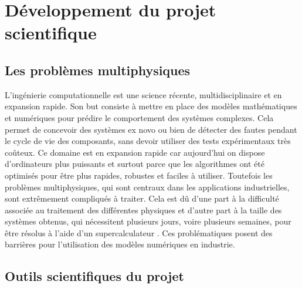 \documentclass[12pt, french]{article}
\begin{document}
	
	\section{Développement du projet scientifique}
	
	\subsection{Les problèmes multiphysiques}
	L'ingénierie computationnelle est une science récente, multidisciplinaire et en expansion rapide. Son but consiste à mettre en place des modèles mathématiques et numériques pour prédire le comportement des systèmes complexes. Cela permet de concevoir des systèmes ex novo ou bien de détecter des fautes pendant le cycle de vie des composants, sans devoir utiliser des tests expérimentaux très co\^{u}teux. Ce domaine est en expansion rapide car aujourd'hui on dispose d'ordinateurs plus puissants et surtout parce que les algorithmes ont été optimisés pour être plus rapides, robustes et faciles à utiliser. Toutefois les problèmes multiphysiques, qui sont centraux dans les applications industrielles, sont extrêmement compliqués à traiter. Cela est d\^u d'une part à la difficulté associée au traitement des différentes physiques et d'autre part à la taille des systèmes obtenus, qui nécessitent plusieurs jours, voire plusieurs semaines, pour être résolus à l'aide d'un supercalculateur \cite{keyes2013}. Ces problématiques posent des barrières pour l'utilisation des modèles numériques en industrie. 
	
	
	\subsection{Outils scientifiques du projet}
	
	
\end{document}
